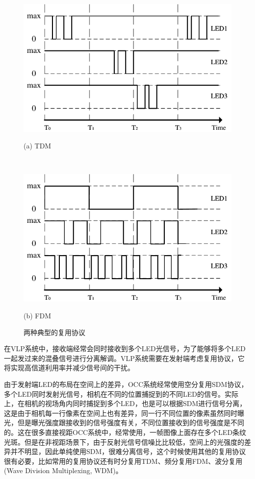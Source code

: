 \begin{figure}[!t]
\centering
  \begin{minipage}{0.6\linewidth}
    \centerline{\includegraphics[width=\textwidth]{FIG/TDM.pdf}}
    \centerline{(a) TDM}
  \end{minipage}\\
\vspace{10pt}
  \begin{minipage}{0.6\linewidth}
    \centerline{\includegraphics[width=\textwidth]{FIG/FDM.pdf}}
    \centerline{(b) FDM}
  \end{minipage}
  \vfill
  \caption{两种典型的复用协议}
  \label{fig:mutiple}
\end{figure}
在VLP系统中，接收端经常会同时接收到多个LED光信号，为了能够将多个LED一起发过来的混叠信号进行分离解调。VLP系统需要在发射端考虑复用协议，它将实现高信道利用率并减少信号间的干扰。


由于发射端LED的布局在空间上的差异，OCC系统经常使用空分复用SDM协议，多个LED同时发射光信号，相机在不同的位置捕捉到的不同LED的信号。实际上，在相机的视场角内同时捕捉到多个LED，也是可以根据SDM进行信号分离，这是由于相机每一行像素在空间上也有差异，同一行不同位置的像素虽然同时曝光，但是曝光强度跟接收到的信号强度有关，不同位置接收到的信号强度是不同的。这在很多直接视距OCC系统中，经常使用，一帧图像上面存在多个LED条纹光斑。但是在非视距场景下，由于反射光信号信噪比比较低，空间上的光强度的差异并不明显，因此单纯使用SDM，很难分离信号，这个时候使用其他的复用协议很有必要，比如常用的复用协议还有时分复用TDM、频分复用FDM、波分复用(Wave Division Multiplexing, WDM)。


